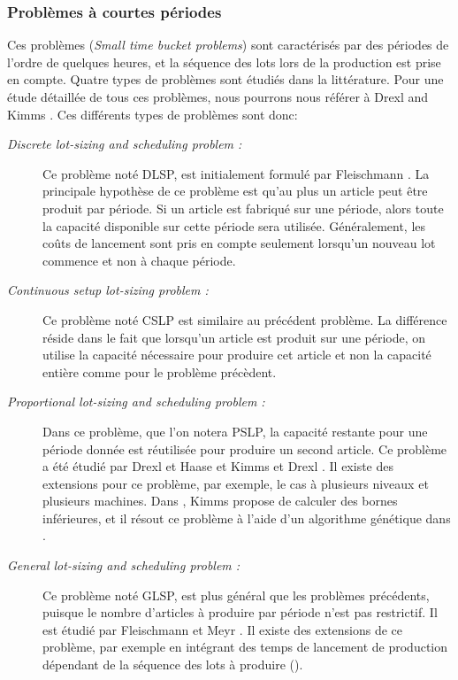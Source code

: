 \documentclass[12pt,a4paper]{article}
\begin{document}
	\subsubsection{Problèmes à courtes périodes}
	Ces problèmes (\emph{Small time bucket problems}) sont caractérisés par des périodes de l'ordre de quelques heures, et la séquence des lots lors de la production est prise en compte. Quatre types de problèmes sont étudiés dans la littérature. Pour une étude détaillée de tous ces problèmes, nous pourrons nous référer à Drexl and Kimms \cite{drexl_kimms}. Ces différents types de problèmes sont donc:
	\begin{description}
		\item[\textsl{Discrete lot-sizing and scheduling problem :}]
		Ce problème noté DLSP, est initialement formulé par Fleischmann \cite{fleischmann}. La principale hypothèse de ce problème est qu'au plus un article peut être produit par
période. Si un article est fabriqué sur une période, alors toute la capacité disponible sur cette période sera utilisée. Généralement, les coûts de lancement sont pris en compte seulement lorsqu'un nouveau lot commence et non à chaque période.
		\item[\textsl{Continuous setup lot-sizing problem :}]
		Ce problème noté CSLP est similaire au précédent problème. La différence réside dans le fait que lorsqu'un article est produit sur une période, on utilise la capacité nécessaire pour produire cet article et non la capacité entière comme pour le problème précèdent.
		\item[\textsl{Proportional lot-sizing and scheduling problem : }] 
		Dans ce problème, que l'on notera PSLP, la capacité restante pour une période donnée est réutilisée pour produire un second article. Ce problème a été étudié par Drexl et Haase \cite{drexl_haase} et Kimms et Drexl \cite{drexl_kimms}. Il existe des extensions pour ce problème, par exemple, le cas à plusieurs niveaux et plusieurs machines. Dans \cite{kimms}, Kimms propose de calculer des bornes inférieures, et il résout ce problème à l'aide d'un algorithme génétique dans \cite{kimms2}.
		\item[\textsl{General lot-sizing and scheduling problem : }] 
		Ce problème noté GLSP, est plus général que les problèmes précédents, puisque le nombre d'articles à produire par période n'est pas restrictif. Il est étudié par Fleischmann et Meyr \cite{fleischmann_meyr}. Il existe des extensions de ce problème, par exemple en intégrant des temps de lancement de production dépendant de la séquence des lots à produire (\cite{meyr}).
	\end{description}
	
\end{document}
